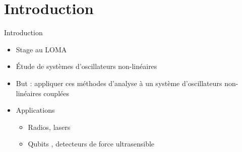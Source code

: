 \section{Introduction}
\begin{frame}{Introduction}
  \begin{itemize}
    \item Stage au LOMA
    \item Étude de systèmes d'oscillateurs non-linéaires
    \item But : appliquer ces méthodes d'analyse à un système d'oscillateurs non-linéaires couplées
    \item Applications
    \begin{itemize}
      \item Radios, lasers
      \item Qubits \cite{pistolesi_proposal_2021}, detecteurs de force ultrasensible \cite{moser_ultrasensitive_2013}
    \end{itemize}
  \end{itemize}
\end{frame}

